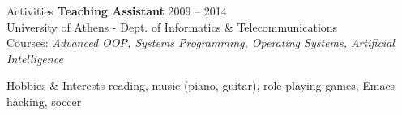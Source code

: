 \documentclass{resume}
\begin{document}


\begin{rSection}{Activities}
  {\bf Teaching Assistant} \hfill {2009 -- 2014} \\
  University of Athens - Dept. of Informatics \& Telecommunications \\
  Courses: \emph{Advanced OOP, Systems Programming, Operating Systems,
    Artificial Intelligence} \\
\end{rSection}


\begin{rSection}{Hobbies \& Interests}
  reading, music (piano, guitar), role-playing games, Emacs hacking, soccer \\
\end{rSection}
\end{document}
